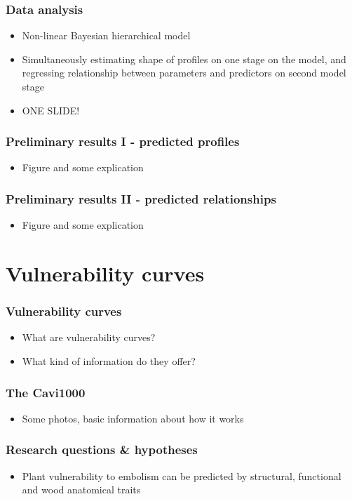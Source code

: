 \documentclass[usepdftitle=false]{beamer}
\begin{document}
\begin{frame}
	\frametitle{Data analysis}
	\begin{itemize}
		\item Non-linear Bayesian hierarchical model
		\item Simultaneously estimating shape of profiles on one stage on the model, and regressing relationship between parameters and predictors on second model stage
		\item ONE SLIDE!
	\end{itemize}
\end{frame}

\begin{frame}
	\frametitle{Preliminary results I - predicted profiles}
	\begin{itemize}
		\item Figure and some explication 
	\end{itemize}
\end{frame}

\begin{frame}
	\frametitle{Preliminary results II - predicted relationships}
	\begin{itemize}
		\item Figure and some explication 
	\end{itemize}
\end{frame}

\section{Vulnerability curves}
\begin{frame}
	\frametitle{Vulnerability curves}
	\begin{itemize}
		\item What are vulnerability curves?
		\item What kind of information do they offer?
	\end{itemize}  
\end{frame}

\begin{frame}
	\frametitle{The Cavi1000}
	\begin{itemize}
		\item Some photos, basic information about how it works
	\end{itemize}
\end{frame}

\begin{frame}
	\frametitle{Research questions \& hypotheses}
	\begin{itemize}
		\item Plant vulnerability to embolism can be predicted by structural, functional and wood anatomical traits
	\end{itemize}
\end{frame}
\end{document}
